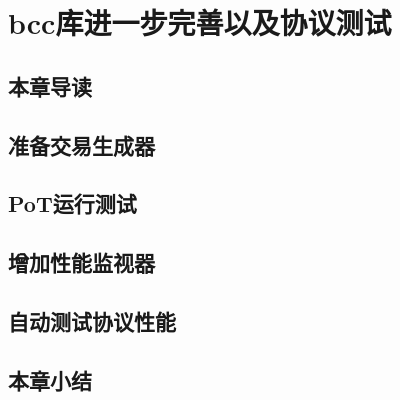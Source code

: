 \chapter{bcc库进一步完善以及协议测试}

\section{本章导读}

\section{准备交易生成器}

\section{PoT运行测试}

\section{增加性能监视器}

\section{自动测试协议性能}

\section{本章小结}

